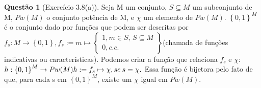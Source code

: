 \documentclass[tikz,border=5]{article}
\theoremstyle{definition}
\newtheorem{exerc}{Questão}
\begin{document}
	\begin{exerc}[Exercício 3.8(a)]
		Seja M um conjunto, $S \subseteq M$ um subconjunto de M, $Pw(M)$ o conjunto potência de M, e $\chi$ um elemento de $Pw(M)$. $\left \{ 0,1 \right \}^M$ é o conjunto dado por funções que podem ser descritas por $f_s:M \rightarrow  \left \{ 0,1 \right \}, f_s:= m \mapsto \begin{Bmatrix}
			1, m\in  S,\, S \subseteq M \\0, c.c. \end{Bmatrix}$(chamada de funções indicativas ou características). Podemos criar a função que relaciona $f_s$  e $\chi$:$\newline h:\left \{ 0,1 \right \}^M \rightarrow Pw(M)
		\newline h:= f_s \mapsto \chi, se \: s = \chi.$ Essa função é bijetora pelo fato de que, para cada s em $\left \{ 0,1 \right \}^M$, existe um $\chi$ igual em $Pw(M)$. 
	\end{exerc}
\end{document}
